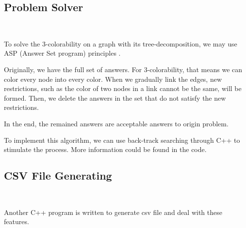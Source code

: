 \subsection{Problem Solver}~\label{sec.DataGen3}

To solve the 3-colorability on a graph with its tree-decomposition, we may use ASP (Answer Set program) principles \cite{ASP2008}.

Originally, we have the full set of answers. For 3-colorability, that means we can color every node into every color. When we gradually link the edges, new restrictions, such as the color of two nodes in a link cannot be the same, will be formed. Then, we delete the answers in the set that do not satisfy the new restrictions.

In the end, the remained answers are acceptable answers to origin problem.

To implement this algorithm, we can use back-track searching through C++ to stimulate the process. More information could be found in the code.

\subsection{CSV File Generating}~\label{sec.DataGen4}

Another C++ program is written to generate csv file and deal with these features.
